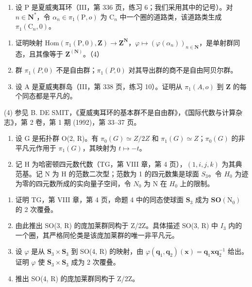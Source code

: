 \begin{enumerate}
\def\labelenumi{\arabic{enumi})}
\setcounter{enumi}{4}
\tightlist
\item
  设 P 是夏威夷耳环（III，第 336 页，练习 6；我们采用其中的记号）。对 \(n \in \mathbf{N}^*\)，令 \(\alpha_n \in \pi_1(\mathrm{P}, o)\) 为 \(\mathrm{C}_n\) 中一个圈的道路类，该道路类生成 \(\pi_1(\mathrm{C}_n, 0)\)。
\end{enumerate}

\begin{enumerate}
\def\labelenumi{\alph{enumi})}
\item
  证明映射 \(\mathrm{Hom}(\pi_{1}(\mathrm{P},0),\mathbf{Z})\to\mathbf{Z}^{\mathbf{N}}\)，\(\varphi\mapsto(\varphi(\alpha_{n}))_{n\in\mathbf{N}}\)，是单射群同态，且其像等于 \(\mathbf{Z}^{(\mathbf{N})}\)。（4）
\item
  群 \(\pi_{1}(P,0)\) 不是自由群；\(\pi_{1}(P,0)\) 对其导出群的商不是自由阿贝尔群。
\item
  设 A 是夏威夷群岛（III，第 338 页，练习 10）。证明从 \(\pi_1(A, o)\) 到 \(\mathbf{Z}\) 的每个同态都是平凡的。
\end{enumerate}

(4) 参见 B. DE SMIT，《夏威夷耳环的基本群不是自由群》，《国际代数与计算杂志》，第 2 卷，第 1 期 (1992)，第 33–37 页。

\exercisegroup

\begin{enumerate}
\def\labelenumi{\arabic{enumi})}
\item
  设 G 是拓扑群 O(2, R)。有 \(\pi_{0}(G) \simeq Z/2Z\) 和 \(\pi_{1}(G) \simeq Z\)；\(\pi_{0}(G)\) 的非平凡元作用于 \(\pi_{1}(G)\)，其映射为 \(t \mapsto -t\)。
\item
  记 H 为哈密顿四元数代数（TG，第 VIII 章，第 4 页），\((1, i, j, k)\) 为其典范基。记 N 为 H 的范数二次型；范数为 1 的四元数集是球面 \(S_{3}\)。令 \(H_{0}\) 为迹为零的四元数所成的实向量子空间，令 \(N_{0}\) 为 N 在 \(H_{0}\) 上的限制。
\end{enumerate}

\begin{enumerate}
\def\labelenumi{\alph{enumi})}
\item
  证明 TG，第 VIII 章，第 4 页，命题 4 中的同态使球面 \(\mathbf{S}_3\) 成为 \(\mathbf{SO}(\mathrm{N}_0)\) 的 2 次覆叠。
\item
  由此推出 SO(3, R) 的庞加莱群同构于 Z/2Z。具体描述 SO(3, R) 中 \(I_{3}\) 内的一个圈，其严格同伦类是该庞加莱群的唯一非平凡元。
\item
  设 \(\varphi\) 是从 \(\mathbf{S}_3 \times \mathbf{S}_3\) 到 SO(4, R) 的映射，由 \(\varphi(\mathbf{q}_1, \mathbf{q}_2)(\mathbf{x}) = \mathbf{q}_1 \mathbf{x} \mathbf{q}_2^{-1}\) 给出。证明 \(\varphi\) 使 \(\mathbf{S}_3 \times \mathbf{S}_3\) 成为 2 次覆叠。
\item
  推出 SO(4, R) 的庞加莱群同构于 Z/2Z。
\end{enumerate}

